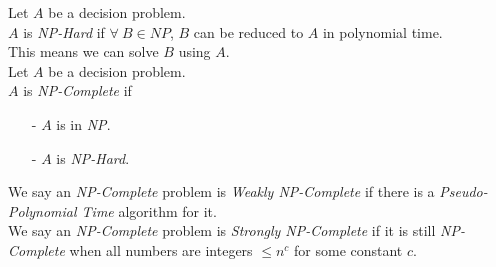 \documentclass[11pt,a4paper]{article}
\begin{document}
Let $A$ be a decision problem.\\
$A$ is \textit{NP-Hard} if $\forall\ B\in NP$, $B$ can be reduced to $A$ in polynomial time.\\
\nb This means we can solve $B$ using $A$.\\

Let $A$ be a decision problem.\\
$A$ is \textit{NP-Complete} if
\begin{itemize}
	\item[-] $A$ is in \textit{NP}.
	\item[-] $A$ is \textit{NP-Hard}.
\end{itemize}


We say an \textit{NP-Complete} problem is \textit{Weakly NP-Complete} if there is a \textit{Pseudo-Polynomial Time} algorithm for it.\\

We say an \textit{NP-Complete} problem is \textit{Strongly NP-Complete} if it is still \textit{NP-Complete} when all numbers are integers $\leq n^c$ for some constant $c$.
\end{document}

